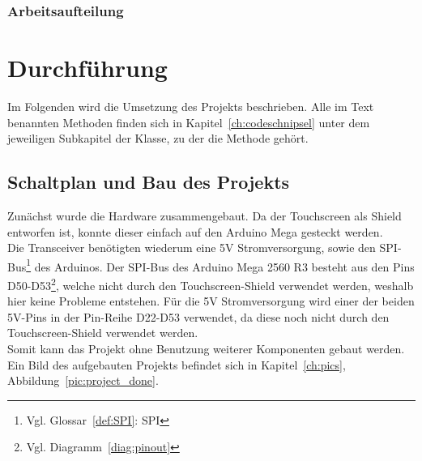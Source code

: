 \documentclass[a4paper, 11pt]{scrartcl}
\begin{document}
\subsubsection{Arbeitsaufteilung}

\section{Durchführung}
Im Folgenden wird die Umsetzung des Projekts beschrieben. Alle im Text benannten Methoden finden sich in Kapitel~\ref{ch:codeschnipsel} unter dem jeweiligen Subkapitel
der Klasse, zu der die Methode gehört.

\subsection{Schaltplan und Bau des Projekts}
Zunächst wurde die Hardware zusammengebaut. Da der Touchscreen als Shield entworfen ist, konnte dieser einfach auf den Arduino Mega gesteckt werden.
\\
Die Transceiver benötigten wiederum eine 5V Stromversorgung, sowie den SPI-Bus\footnote{Vgl. Glossar~\ref{def:SPI}: SPI} des Arduinos. Der SPI-Bus des Arduino Mega
2560 R3 besteht aus den Pins D50-D53\footnote{Vgl. Diagramm~\ref{diag:pinout}}, welche nicht durch den Touchscreen-Shield verwendet werden, weshalb hier keine Probleme
entstehen. Für die 5V Stromversorgung wird einer der beiden 5V-Pins in der Pin-Reihe D22-D53 verwendet, da diese noch nicht durch den Touchscreen-Shield verwendet werden.
\\
Somit kann das Projekt ohne Benutzung weiterer Komponenten gebaut werden. Ein Bild des aufgebauten Projekts befindet sich in Kapitel~\ref{ch:pics}, Abbildung~\ref{pic:project_done}.
\end{document}
